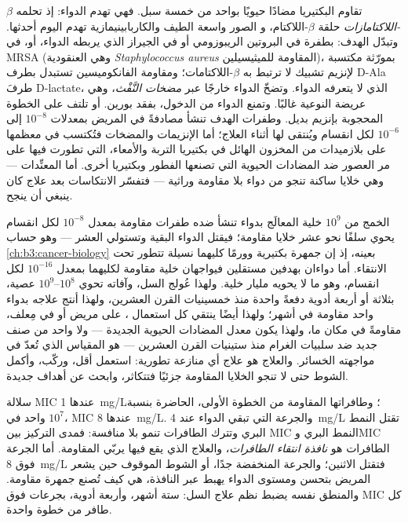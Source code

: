 \begin{definition}[المقاومة]\label{def:b3:bacteriology:resistance}
تقاوم البكتيريا مضادًا حيويًا بواحد من خمسة سبل. فهي تهدم
الدواء: إذ تحلمه \emph{$\beta$-اللاكتامازات} حلقة $\beta$-اللاكتام، و
الصور واسعة الطيف والكاربابينيمازية تهدم اليوم
أحدثها. وتبدّل الهدف: بطفرة في البروتين الريبوزومي
أو في الجيراز الذي يربطه الدواء، أو، في MRSA (وهي العنقودية
\emph{Staphylococcus aureus} المقاومة للميثيسيلين)، بمورّثة مكتسبة لإنزيم
تشبيك لا ترتبط به $\beta$-اللاكتامات؛ ومقاومة الفانكوميسين تستبدل
بطرف D-Ala طرفَ D-lactate، الذي لا يتعرفه الدواء.
وتضخّ الدواء خارجًا عبر \emph{مضخات النَّفْث}، وهي عريضة النوعية
غالبًا. وتمنع الدواء من الدخول، بفقد بورين. أو
تلتف على الخطوة المحجوبة بإنزيم بديل. وطفرات الهدف
تنشأ مصادفةً في المريض بمعدلات $10^{-8}$ إلى $10^{-6}$ لكل
انقسام ويُنتقى لها أثناء العلاج؛ أما الإنزيمات والمضخات فتُكتسب
في معظمها على بلازميدات من المخزون الهائل في بكتيريا التربة والأمعاء،
التي تطورت فيها على مر العصور ضد المضادات الحيوية التي
تصنعها الفطور وبكتيريا أخرى. أما المعنِّدات --- وهي خلايا ساكنة
تنجو من دواء بلا مقاومة وراثية --- فتفسّر الانتكاسات
بعد علاج كان ينبغي أن ينجح.
\end{definition}

\begin{proposition}\label{prop:b3:bacteriology:selection}
الخمج من $10^{9}$ خلية المعالَج بدواء تنشأ ضده
طفرات مقاومة بمعدل $10^{-8}$ لكل انقسام يحوي سلفًا
نحو عشر خلايا مقاومة؛ فيقتل الدواء البقية وتستولي العشر
--- وهو حساب \cref{ch:b3:cancer-biology} بعينه، إذ إن
جمهرة بكتيرية وورمًا كليهما نسيلة تتطور تحت
الانتقاء. أما دواءان بهدفين مستقلين فيواجهان خلية مقاومة
لكليهما بمعدل $10^{-16}$ لكل انقسام، وهو ما لا يحويه مليار خلية.
ولهذا عُولج السل، وآفاته تحوي $10^{8}$--$10^{9}$ عصية،
بثلاثة أو أربعة أدوية دفعةً واحدة منذ خمسينيات القرن العشرين، ولهذا
أنتج علاجه بدواء واحد مقاومة في أشهر؛ ولهذا أيضًا
ينتقي كل استعمال ، على مريض أو في مِعلف، مقاومةً
في مكان ما، ولهذا يكون معدل المضادات الحيوية الجديدة --- ولا واحد من
صنف جديد ضد سلبيات الغرام منذ ستينيات القرن العشرين --- هو المقياس
الذي تُعدّ في مواجهته الخسائر. والعلاج هو علاج أي منازعة
تطورية: استعمل أقل، وركّب، وأكمل الشوط حتى لا تنجو
الخلايا المقاومة جزئيًا فتتكاثر، وابحث عن أهداف جديدة.
\end{proposition}

\begin{example}\label{ex:b3:bacteriology:window}
سلالة MIC عندها \qty{1}{mg/L}؛ وطافراتها المقاومة من الخطوة الأولى، الحاضرة
بنسبة واحد في $10^{7}$، MIC عندها \qty{8}{mg/L}. والجرعة التي تبقي الدواء
عند \qty{4}{mg/L} تقتل النمط البري وتترك الطافرات تنمو
بلا منافسة: فمدى التركيز بين MIC النمط
البري وMIC الطافرات هو \emph{نافذة انتقاء
الطافرات}، والعلاج الذي يقع فيها يربّي المقاومة. أما الجرعة
فوق \qty{8}{mg/L} فتقتل الاثنين؛ والجرعة المنخفضة جدًا، أو الشوط الموقوف حين
يشعر المريض بتحسن ومستوى الدواء يهبط عبر
النافذة، هي كيف تُصنع جمهرة مقاومة. والمنطق نفسه يضبط
نظم علاج السل: ستة أشهر، وأربعة أدوية، بجرعات
فوق MIC كل طافر من خطوة واحدة.
\end{example}

